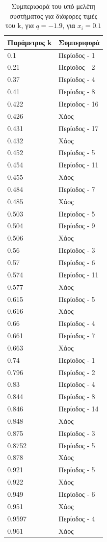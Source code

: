 \begin{table}[ht]
	\centering
	\caption{ Συμπεριφορά του υπό μελέτη συστήματος για διάφορες τιμές του k, για $q=-1.9$, για \(x_i=0.1\)}
	\label{tab:abc8}
	\begin{tabular}{l | l}
		Παράμετρος k & Συμπεριφορά \\
		\hline
		0.1 &  Περίοδος -  1 \\
		0.21 &  Περίοδος -  2 \\
		0.37& Περίοδος -  4 \\
		0.41& Περίοδος -  8 \\
		0.422 &  Περίοδος -  16 \\
		0.426& Χάος \\
		0.431& Περίοδος -  17 \\
		0.432& Χάος \\
		0.452 &  Περίοδος -  5 \\
		0.454 &  Περίοδος -  11 \\
		0.455 &  Χάος \\
		0.484 &  Περίοδος -  7\\
		0.485 & Χάος\\
		0.503 & Περίοδος -  5\\
		0.504 & Περίοδος -  9\\
		0.506 &Χάος\\
		0.56 & Περίοδος -  3\\
		0.57 & Περίοδος -  6\\
		0.574 & Περίοδος -  11\\
		0.577 & Χάος\\
		0.615 & Περίοδος -  5\\
		0.616 & Χάος\\
		0.66 & Περίοδος -  4\\
		0.661 & Περίοδος -  7\\
		0.663 & Χάος\\
		0.74 &  Περίοδος -  1\\
		0.796 &  Περίοδος -  2 \\
		0.83& Περίοδος -  4 \\
		0.844& Περίοδος -  8 \\
		0.846 &  Περίοδος -  14 \\
		0.848 &Χάος\\
		0.875& Περίοδος -  3\\
		0.8752 & Περίοδος -  5\\
		0.878 &Χάος\\
		0.921 &  Περίοδος -  5 \\
		0.922& Χάος\\
		0.949 & Περίοδος -  6 \\
		0.951& Χάος \\
		0.9597&Περίοδος -  4\\
		0.961& Χάος\\
		
		
	\end{tabular}
\end{table}

